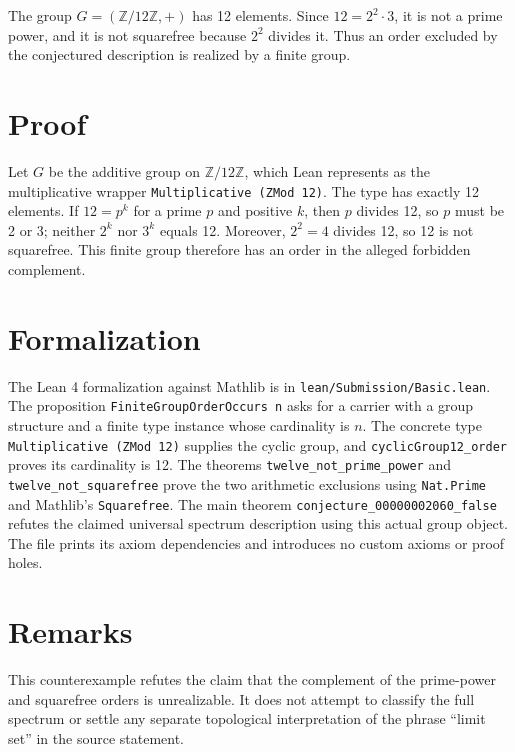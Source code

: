 \documentclass[11pt]{article}
\theoremstyle{plain}
\theoremstyle{definition}
\theoremstyle{remark}
\begin{document}

The group $G=(\mathbb{Z}/12\mathbb{Z},+)$ has 12 elements. Since $12=2^2\cdot 3$, it is not a prime power, and it is not squarefree because $2^2$ divides it. Thus an order excluded by the conjectured description is realized by a finite group.

\section{Proof}

Let $G$ be the additive group on $\mathbb{Z}/12\mathbb{Z}$, which Lean represents as the multiplicative wrapper \texttt{Multiplicative (ZMod 12)}. The type has exactly 12 elements. If $12=p^k$ for a prime $p$ and positive $k$, then $p$ divides 12, so $p$ must be 2 or 3; neither $2^k$ nor $3^k$ equals 12. Moreover, $2^2=4$ divides 12, so 12 is not squarefree. This finite group therefore has an order in the alleged forbidden complement.

\section{Formalization}

The Lean 4 formalization against Mathlib is in \verb|lean/Submission/Basic.lean|. The proposition \verb|FiniteGroupOrderOccurs n| asks for a carrier with a group structure and a finite type instance whose cardinality is $n$. The concrete type \verb|Multiplicative (ZMod 12)| supplies the cyclic group, and \verb|cyclicGroup12_order| proves its cardinality is 12. The theorems \verb|twelve_not_prime_power| and \verb|twelve_not_squarefree| prove the two arithmetic exclusions using \verb|Nat.Prime| and Mathlib's \verb|Squarefree|. The main theorem \verb|conjecture_00000002060_false| refutes the claimed universal spectrum description using this actual group object. The file prints its axiom dependencies and introduces no custom axioms or proof holes.

\section{Remarks}


This counterexample refutes the claim that the complement of the prime-power and squarefree orders is unrealizable. It does not attempt to classify the full spectrum or settle any separate topological interpretation of the phrase ``limit set'' in the source statement.
\end{document}
